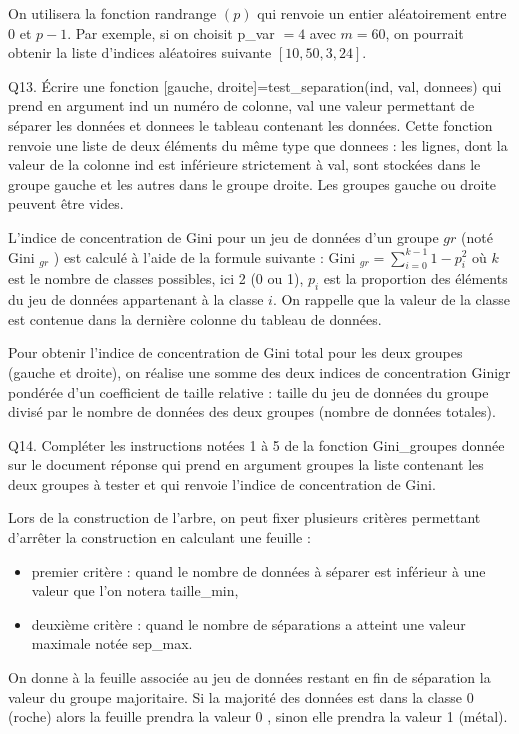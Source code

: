 \documentclass[10pt]{article}
\begin{document}
On utilisera la fonction randrange $(p)$ qui renvoie un entier aléatoirement entre 0 et $p-1$. Par exemple, si on choisit p\_var $=4$ avec $m=60$, on pourrait obtenir la liste d'indices aléatoires suivante $[10,50,3,24]$.

Q13. Écrire une fonction [gauche, droite]=test\_separation(ind, val, donnees) qui prend en argument ind un numéro de colonne, val une valeur permettant de séparer les données et donnees le tableau contenant les données. Cette fonction renvoie une liste de deux éléments du même type que donnees : les lignes, dont la valeur de la colonne ind est inférieure strictement à val, sont stockées dans le groupe gauche et les autres dans le groupe droite. Les groupes gauche ou droite peuvent être vides.

L'indice de concentration de Gini pour un jeu de données d'un groupe $g r$ (noté Gini $_{g r}$ ) est calculé à l'aide de la formule suivante : Gini $_{g r}=\sum_{i=0}^{k-1} 1-p_{i}^{2}$ où $k$ est le nombre de classes possibles, ici 2 (0 ou 1), $p_{i}$ est la proportion des éléments du jeu de données appartenant à la classe $i$. On rappelle que la valeur de la classe est contenue dans la dernière colonne du tableau de données.

Pour obtenir l'indice de concentration de Gini total pour les deux groupes (gauche et droite), on réalise une somme des deux indices de concentration Ginigr pondérée d'un coefficient de taille relative : taille du jeu de données du groupe divisé par le nombre de données des deux groupes (nombre de données totales).

Q14. Compléter les instructions notées 1 à 5 de la fonction Gini\_groupes donnée sur le document réponse qui prend en argument groupes la liste contenant les deux groupes à tester et qui renvoie l'indice de concentration de Gini.

Lors de la construction de l'arbre, on peut fixer plusieurs critères permettant d'arrêter la construction en calculant une feuille :

\begin{itemize}
  \item premier critère : quand le nombre de données à séparer est inférieur à une valeur que l'on notera taille\_min,

  \item deuxième critère : quand le nombre de séparations a atteint une valeur maximale notée sep\_max.

\end{itemize}
On donne à la feuille associée au jeu de données restant en fin de séparation la valeur du groupe majoritaire. Si la majorité des données est dans la classe 0 (roche) alors la feuille prendra la valeur 0 , sinon elle prendra la valeur 1 (métal).
\end{document}
